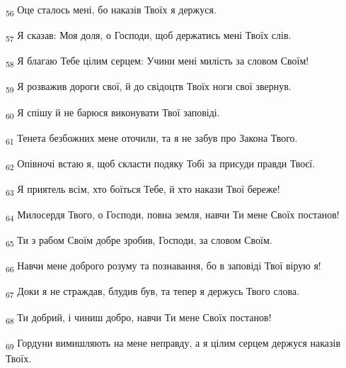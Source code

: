\begin{tcolorbox}
\textsubscript{56} Оце сталось мені, бо наказів Твоїх я держуся.
\end{tcolorbox}
\begin{tcolorbox}
\textsubscript{57} Я сказав: Моя доля, о Господи, щоб держатись мені Твоїх слів.
\end{tcolorbox}
\begin{tcolorbox}
\textsubscript{58} Я благаю Тебе цілим серцем: Учини мені милість за словом Своїм!
\end{tcolorbox}
\begin{tcolorbox}
\textsubscript{59} Я розважив дороги свої, й до свідоцтв Твоїх ноги свої звернув.
\end{tcolorbox}
\begin{tcolorbox}
\textsubscript{60} Я спішу й не барюся виконувати Твої заповіді.
\end{tcolorbox}
\begin{tcolorbox}
\textsubscript{61} Тенета безбожних мене оточили, та я не забув про Закона Твого.
\end{tcolorbox}
\begin{tcolorbox}
\textsubscript{62} Опівночі встаю я, щоб скласти подяку Тобі за присуди правди Твоєї.
\end{tcolorbox}
\begin{tcolorbox}
\textsubscript{63} Я приятель всім, хто боїться Тебе, й хто накази Твої береже!
\end{tcolorbox}
\begin{tcolorbox}
\textsubscript{64} Милосердя Твого, о Господи, повна земля, навчи Ти мене Своїх постанов!
\end{tcolorbox}
\begin{tcolorbox}
\textsubscript{65} Ти з рабом Своїм добре зробив, Господи, за словом Своїм.
\end{tcolorbox}
\begin{tcolorbox}
\textsubscript{66} Навчи мене доброго розуму та познавання, бо в заповіді Твої вірую я!
\end{tcolorbox}
\begin{tcolorbox}
\textsubscript{67} Доки я не страждав, блудив був, та тепер я держусь Твого слова.
\end{tcolorbox}
\begin{tcolorbox}
\textsubscript{68} Ти добрий, і чиниш добро, навчи Ти мене Своїх постанов!
\end{tcolorbox}
\begin{tcolorbox}
\textsubscript{69} Гордуни вимишляють на мене неправду, а я цілим серцем держуся наказів Твоїх.
\end{tcolorbox}
